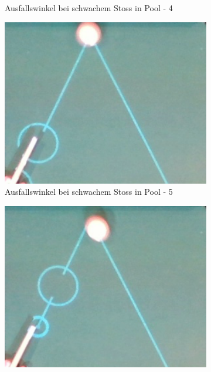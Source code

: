 \begin{figure}[h!]
\begin{subfigure}[b]{0.2\textwidth}
        \caption{Ausfallswinkel bei schwachem Stoss in Pool - 4}
        \label{fig:rebound_angle_slow_pool_4}
    \end{subfigure}
    \hfill
    \begin{subfigure}[b]{0.2\textwidth}
        \centering
        \includegraphics[width=1.0\linewidth]{../common/04_results/resources/simulation/rebound_angle_slow_pool/00_rail_rebound_angle_slow_pool_05.png}
        \caption{Ausfallswinkel bei schwachem Stoss in Pool - 5}
        \label{fig:rebound_angle_slow_pool_5}
    \end{subfigure}
    \hfill
    \begin{subfigure}[b]{0.2\textwidth}
        \centering
        \includegraphics[width=1.0\linewidth]{../common/04_results/resources/simulation/rebound_angle_slow_pool/00_rail_rebound_angle_slow_pool_06.png}

\end{subfigure}
\end{figure}
